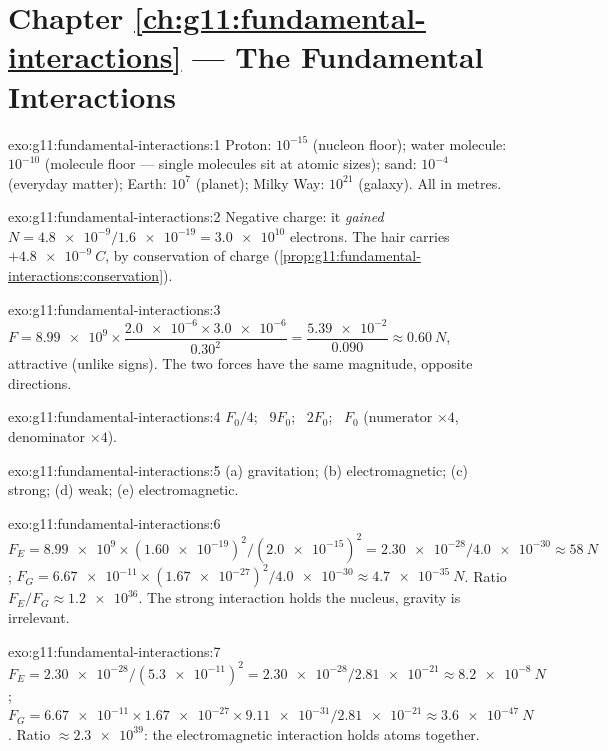 \section*{Chapter \ref{ch:g11:fundamental-interactions} --- The Fundamental Interactions}

\begin{solution}{exo:g11:fundamental-interactions:1}
Proton: $10^{-15}$ (nucleon floor); water molecule: $10^{-10}$
(molecule floor --- single molecules sit at atomic sizes); sand:
$10^{-4}$ (everyday matter); Earth: $10^{7}$ (planet); Milky Way:
$10^{21}$ (galaxy). All in metres.
\end{solution}

\begin{solution}{exo:g11:fundamental-interactions:2}
Negative charge: it \emph{gained}
$N = \num{4.8e-9}/\num{1.6e-19} = \num{3.0e10}$ electrons. The hair
carries $+\qty{4.8e-9}{C}$, by conservation of charge
(\cref{prop:g11:fundamental-interactions:conservation}).
\end{solution}

\begin{solution}{exo:g11:fundamental-interactions:3}
$F = \num{8.99e9} \times \dfrac{\num{2.0e-6} \times \num{3.0e-6}}{0.30^2}
= \dfrac{\num{5.39e-2}}{0.090} \approx \qty{0.60}{N}$, attractive
(unlike signs). The two forces have the same magnitude, opposite
directions.
\end{solution}

\begin{solution}{exo:g11:fundamental-interactions:4}
$F_0/4$; \ $9F_0$; \ $2F_0$; \ $F_0$ (numerator $\times 4$, denominator
$\times 4$).
\end{solution}

\begin{solution}{exo:g11:fundamental-interactions:5}
(a) gravitation; (b) electromagnetic; (c) strong; (d) weak;
(e) electromagnetic.
\end{solution}

\begin{solution}{exo:g11:fundamental-interactions:6}
$F_E = \num{8.99e9} \times (\num{1.60e-19})^2/(\num{2.0e-15})^2
= \num{2.30e-28}/\num{4.0e-30} \approx \qty{58}{N}$;
$F_G = \num{6.67e-11} \times (\num{1.67e-27})^2/\num{4.0e-30}
\approx \qty{4.7e-35}{N}$. Ratio $F_E/F_G \approx \num{1.2e36}$. The
strong interaction holds the nucleus, gravity is irrelevant.
\end{solution}

\begin{solution}{exo:g11:fundamental-interactions:7}
$F_E = \num{2.30e-28}/(\num{5.3e-11})^2 = \num{2.30e-28}/\num{2.81e-21}
\approx \qty{8.2e-8}{N}$;
$F_G = \num{6.67e-11} \times \num{1.67e-27} \times \num{9.11e-31} /
\num{2.81e-21} \approx \qty{3.6e-47}{N}$. Ratio $\approx \num{2.3e39}$:
the electromagnetic interaction holds atoms together.
\end{solution}

